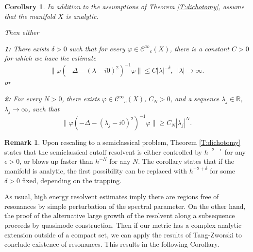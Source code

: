 \documentclass[twoside, final]{amsart}
\newtheorem{corollary}[proposition]{Corollary}
\theoremstyle{definition}
\newtheorem{remark}[proposition]{Remark}
\numberwithin{equation}{section}
\begin{document}
\begin{corollary}
\label{C:little-o}
In addition to the assumptions of Theorem \ref{T:dichotomy}, assume
that the manifold $X$ is analytic.  

Then either

{\bf 1:}  There exists $\delta>0$ such that for every ${\varphi} \in
{{\mathcal C}^\infty}_c(X)$, there is a constant $C>0$ for which  we have
the estimate 
\begin{equation}
\label{E:lambda-delta}
\| {\varphi} (-\Delta - (\lambda - i0)^2)^{-1} {\varphi} \| {\leqslant} C | \lambda |^{-\delta},
\,\,\, | \lambda | \to \infty.
\end{equation}
or

{\bf 2:}  For every $N>0$, there exists ${\varphi} \in {{\mathcal C}^\infty}_c(X)$, $C_N>0$, and a sequence $\lambda_j \in
{{\mathbb R}}$, $\lambda_j \to \infty$, such that 
\begin{equation}
\label{E:lambda-bup-2}
\| {\varphi} (-\Delta - (\lambda_j - i0)^2)^{-1} {\varphi} \| {\geqslant} C_N |\lambda_j|^N.
\end{equation}

\end{corollary}

\begin{remark} 

Upon rescaling to a semiclassical problem, Theorem \ref{T:dichotomy}
states that the semiclassical cutoff resolvent is either controlled by
$h^{-2-\epsilon}$ for any $\epsilon>0$, or blows up faster than
$h^{-N}$ for any $N$.  The 
corollary states that if the manifold is analytic, the first possibility can be replaced with
$h^{-2 + \delta}$ for some $\delta>0$ fixed, depending on the trapping.

\end{remark}

As usual, high energy resolvent estimates imply there are regions free
of resonances by simple perturbation of the spectral parameter.  On
the other hand, the proof of the alternative large growth of the
resolvent along a subsequence proceeds by quasimode construction.
Then 
if our metric has a complex analytic extension outside
of a compact set, we can apply the results of Tang-Zworski \cite{TaZw}
to conclude existence of resonances.  This results in the following
Corollary.
\end{document}
